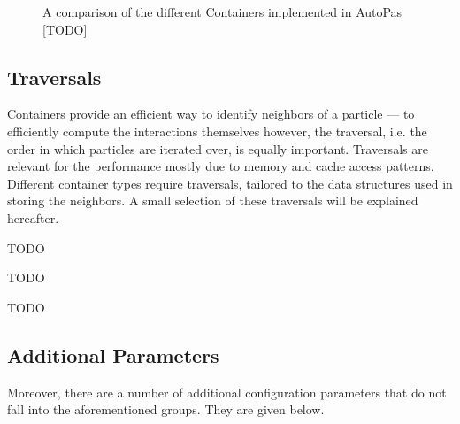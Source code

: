 \begin{figure}
	\centering
	\caption{A comparison of the different Containers implemented in AutoPas [TODO]}
	\label{fig:containers}
\end{figure}

\subsection{Traversals}
\label{sec:traversals}
Containers provide an efficient way to identify neighbors of a particle --- to efficiently compute the interactions themselves however, the traversal, i.e. the order in which particles are iterated over, is equally important. Traversals are relevant for the performance mostly due to memory and cache access patterns. Different container types require traversals, tailored to the data structures used in storing the neighbors. A small selection of these traversals will be explained hereafter.

\begin{description}[leftmargin=!,labelwidth=\widthof{\textbf{VL List Iteration}}]
\item[\textbf{C01}] TODO
\item[\textbf{VL List Iteration}] TODO
\item[\textbf{LC C04}] TODO
\end{description}

\subsection{Additional Parameters}
Moreover, there are a number of additional configuration parameters that do not fall into the aforementioned groups. They are given below.

